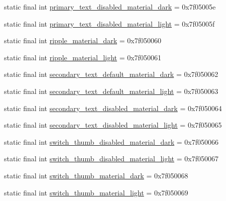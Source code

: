 \begin{DoxyCompactItemize}
\item 
static final int \mbox{\hyperlink{classandroid_1_1support_1_1design_1_1_r_1_1color_a8a9d0f72c61f70a41ba77788e9736d8a}{primary\+\_\+text\+\_\+disabled\+\_\+material\+\_\+dark}} = 0x7f05005e
\item 
static final int \mbox{\hyperlink{classandroid_1_1support_1_1design_1_1_r_1_1color_ac0f7294ee1ed3eedd5a3d26e0c77c5f0}{primary\+\_\+text\+\_\+disabled\+\_\+material\+\_\+light}} = 0x7f05005f
\item 
static final int \mbox{\hyperlink{classandroid_1_1support_1_1design_1_1_r_1_1color_a485c0ef87a8bd8a5ec8d0a7cb74d0fb3}{ripple\+\_\+material\+\_\+dark}} = 0x7f050060
\item 
static final int \mbox{\hyperlink{classandroid_1_1support_1_1design_1_1_r_1_1color_a587b8e8b3b093ff91615e0ac3120fd70}{ripple\+\_\+material\+\_\+light}} = 0x7f050061
\item 
static final int \mbox{\hyperlink{classandroid_1_1support_1_1design_1_1_r_1_1color_a6f174e05ba31135d1c5c92593120f324}{secondary\+\_\+text\+\_\+default\+\_\+material\+\_\+dark}} = 0x7f050062
\item 
static final int \mbox{\hyperlink{classandroid_1_1support_1_1design_1_1_r_1_1color_a72180126550e159673be266d96a21b96}{secondary\+\_\+text\+\_\+default\+\_\+material\+\_\+light}} = 0x7f050063
\item 
static final int \mbox{\hyperlink{classandroid_1_1support_1_1design_1_1_r_1_1color_a439b5b7bfd6aaf629ee7d085c3e36ea2}{secondary\+\_\+text\+\_\+disabled\+\_\+material\+\_\+dark}} = 0x7f050064
\item 
static final int \mbox{\hyperlink{classandroid_1_1support_1_1design_1_1_r_1_1color_ae27cdcff381386cb13c4d0c01c85db0e}{secondary\+\_\+text\+\_\+disabled\+\_\+material\+\_\+light}} = 0x7f050065
\item 
static final int \mbox{\hyperlink{classandroid_1_1support_1_1design_1_1_r_1_1color_aa72f26814bf37414e4094fdc0439c85a}{switch\+\_\+thumb\+\_\+disabled\+\_\+material\+\_\+dark}} = 0x7f050066
\item 
static final int \mbox{\hyperlink{classandroid_1_1support_1_1design_1_1_r_1_1color_aa7d7ba16921f098226179c0cc9110c0c}{switch\+\_\+thumb\+\_\+disabled\+\_\+material\+\_\+light}} = 0x7f050067
\item 
static final int \mbox{\hyperlink{classandroid_1_1support_1_1design_1_1_r_1_1color_aa747920ff464421ba1f1f9c3f78bf414}{switch\+\_\+thumb\+\_\+material\+\_\+dark}} = 0x7f050068
\item 
static final int \mbox{\hyperlink{classandroid_1_1support_1_1design_1_1_r_1_1color_a390bb266a32710d89c28dd338a73ef9a}{switch\+\_\+thumb\+\_\+material\+\_\+light}} = 0x7f050069

\end{DoxyCompactItemize}
